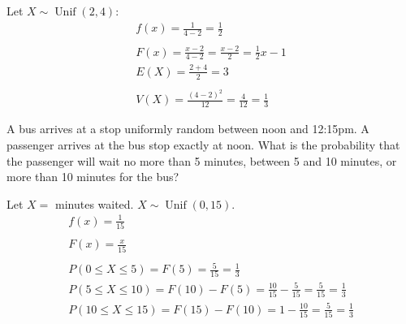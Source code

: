 \documentclass[letterpaper,12pt,fleqn]{article}
\DeclareMathOperator{\unif}{Unif}
\begin{document}
\begin{example}
  Let \(X\sim\unif(2,4)\):
  \begin{gather*}
    f(x)=\frac{1}{4-2}=\frac{1}{2} \\
    \\
    F(x)=\frac{x-2}{4-2}=\frac{x-2}{2}=\frac{1}{2}x-1
    \\
    E(X)=\frac{2+4}{2}=3 \\
    \\
    V(X)=\frac{(4-2)^2}{12}=\frac{4}{12}=\frac{1}{3}
  \end{gather*}
\end{example}

\begin{example}
  A bus arrives at a stop uniformly random between noon and 12:15pm.  A passenger arrives at the bus stop exactly at noon.
  What is the probability that the passenger will wait no more than 5 minutes, between 5 and 10 minutes, or more than 10
  minutes for the bus?

  Let \(X=\) minutes waited.  \(X\sim\unif(0,15)\).
  \begin{gather*}
    f(x)=\frac{1}{15} \\
    \\
    F(x)=\frac{x}{15} \\
    \\
    P(0\le X\le5)=F(5)=\frac{5}{15}=\frac{1}{3} \\
    P(5\le X\le 10)=F(10)-F(5)=\frac{10}{15}-\frac{5}{15}=\frac{5}{15}=\frac{1}{3} \\
    P(10\le X\le15)=F(15)-F(10)=1-\frac{10}{15}=\frac{5}{15}=\frac{1}{3}
  \end{gather*}
\end{example}
\end{document}
